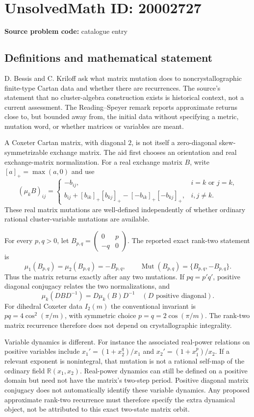 \documentclass[11pt]{article}
\newcommand{\R}{\mathbb{R}}
\begin{document}
\section*{UnsolvedMath ID: 20002727}
\textbf{Source problem code:} catalogue entry
\subsection{Definitions and mathematical statement}
D. Bessis and C. Kriloff ask what matrix mutation does to noncrystallographic finite-type Cartan data and whether there are recurrences. The source's statement that no cluster-algebra construction exists is historical context, not a current assessment. The Reading--Speyer remark reports approximate returns close to, but bounded away from, the initial data without specifying a metric, mutation word, or whether matrices or variables are meant.

A Coxeter Cartan matrix, with diagonal $2$, is not itself a zero-diagonal skew-symmetrizable exchange matrix. The aid first chooses an orientation and real exchange-matrix normalization. For a real exchange matrix $B$, write $[a]_+=\max(a,0)$ and use
\[
 (\mu_kB)_{ij}=\begin{cases}
 -b_{ij},&i=k\text{ or }j=k,\\
 b_{ij}+[b_{ik}]_+[b_{kj}]_+-[-b_{ik}]_+[-b_{kj}]_+,&i,j\ne k.
 \end{cases}
\]
These real matrix mutations are well-defined independently of whether ordinary rational cluster-variable mutations are available.

For every $p,q>0$, let $B_{p,q}=\left(\begin{smallmatrix}0&p\\-q&0\end{smallmatrix}\right)$. The reported exact rank-two statement is
\[
 \mu_1(B_{p,q})=\mu_2(B_{p,q})=-B_{p,q},\qquad
 \operatorname{Mut}(B_{p,q})=\{B_{p,q},-B_{p,q}\}.
\]
Thus the matrix returns exactly after any two mutations. If $pq=p'q'$, positive diagonal conjugacy relates the two normalizations, and
\[
 \mu_k(DBD^{-1})=D\mu_k(B)D^{-1}\quad(D\text{ positive diagonal}).
\]
For dihedral Coxeter data $I_2(m)$ the conventional invariant is $pq=4\cos^2(\pi/m)$, with symmetric choice $p=q=2\cos(\pi/m)$. The rank-two matrix recurrence therefore does not depend on crystallographic integrality.

Variable dynamics is different. For instance the associated real-power relations on positive variables include $x_1'=(1+x_2^q)/x_1$ and $x_2'=(1+x_1^p)/x_2$. If a relevant exponent is nonintegral, that mutation is not a rational self-map of the ordinary field $\R(x_1,x_2)$. Real-power dynamics can still be defined on a positive domain but need not have the matrix's two-step period. Positive diagonal matrix conjugacy does not automatically identify these variable dynamics. Any proposed approximate rank-two recurrence must therefore specify the extra dynamical object, not be attributed to this exact two-state matrix orbit.
\end{document}
